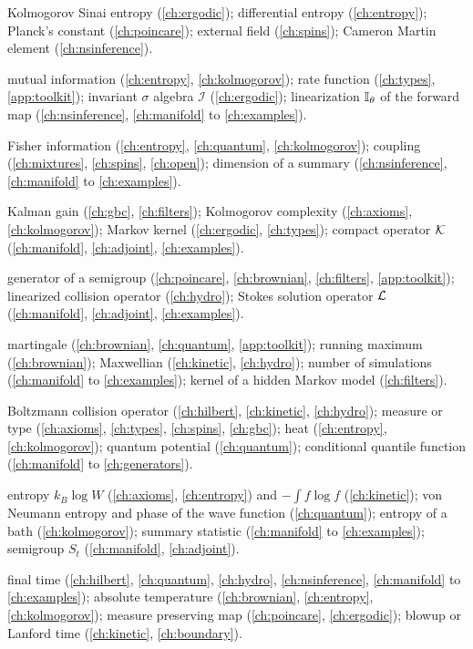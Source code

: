 \begin{description}[leftmargin=2.2em,labelwidth=1.8em,labelsep=0.4em,itemsep=0pt,parsep=0pt]
\item[$h$] Kolmogorov Sinai entropy (\ref{ch:ergodic}); differential entropy (\ref{ch:entropy}); Planck's constant (\ref{ch:poincare}); external field (\ref{ch:spins}); Cameron Martin element (\ref{ch:nsinference}).
\item[$I$] mutual information (\ref{ch:entropy}, \ref{ch:kolmogorov}); rate function (\ref{ch:types}, \ref{app:toolkit}); invariant $\sigma$ algebra $\mathcal I$ (\ref{ch:ergodic}); linearization $\mathbb{I}_\theta$ of the forward map (\ref{ch:nsinference}, \ref{ch:manifold} to \ref{ch:examples}).
\item[$J$] Fisher information (\ref{ch:entropy}, \ref{ch:quantum}, \ref{ch:kolmogorov}); coupling (\ref{ch:mixtures}, \ref{ch:spins}, \ref{ch:open}); dimension of a summary (\ref{ch:nsinference}, \ref{ch:manifold} to \ref{ch:examples}).
\item[$K$] Kalman gain (\ref{ch:gbc}, \ref{ch:filters}); Kolmogorov complexity (\ref{ch:axioms}, \ref{ch:kolmogorov}); Markov kernel (\ref{ch:ergodic}, \ref{ch:types}); compact operator $\mathcal{K}$ (\ref{ch:manifold}, \ref{ch:adjoint}, \ref{ch:examples}).
\item[$\mathcal L$] generator of a semigroup (\ref{ch:poincare}, \ref{ch:brownian}, \ref{ch:filters}, \ref{app:toolkit}); linearized collision operator (\ref{ch:hydro}); Stokes solution operator $\mathcal{L}$ (\ref{ch:manifold}, \ref{ch:adjoint}, \ref{ch:examples}).
\item[$M$] martingale (\ref{ch:brownian}, \ref{ch:quantum}, \ref{app:toolkit}); running maximum (\ref{ch:brownian}); Maxwellian (\ref{ch:kinetic}, \ref{ch:hydro}); number of simulations (\ref{ch:manifold} to \ref{ch:examples}); kernel of a hidden Markov model (\ref{ch:filters}).
\item[$Q$] Boltzmann collision operator (\ref{ch:hilbert}, \ref{ch:kinetic}, \ref{ch:hydro}); measure or type (\ref{ch:axioms}, \ref{ch:types}, \ref{ch:spins}, \ref{ch:gbc}); heat (\ref{ch:entropy}, \ref{ch:kolmogorov}); quantum potential (\ref{ch:quantum}); conditional quantile function (\ref{ch:manifold} to \ref{ch:generators}).
\item[$S$] entropy $k_B\log W$ (\ref{ch:axioms}, \ref{ch:entropy}) and $-\int f\log f$ (\ref{ch:kinetic}); von Neumann entropy and phase of the wave function (\ref{ch:quantum}); entropy of a bath (\ref{ch:kolmogorov}); summary statistic (\ref{ch:manifold} to \ref{ch:examples}); semigroup $S_t$ (\ref{ch:manifold}, \ref{ch:adjoint}).
\item[$T$] final time (\ref{ch:hilbert}, \ref{ch:quantum}, \ref{ch:hydro}, \ref{ch:nsinference}, \ref{ch:manifold} to \ref{ch:examples}); absolute temperature (\ref{ch:brownian}, \ref{ch:entropy}, \ref{ch:kolmogorov}); measure preserving map (\ref{ch:poincare}, \ref{ch:ergodic}); blowup or Lanford time (\ref{ch:kinetic}, \ref{ch:boundary}).

\end{description}
